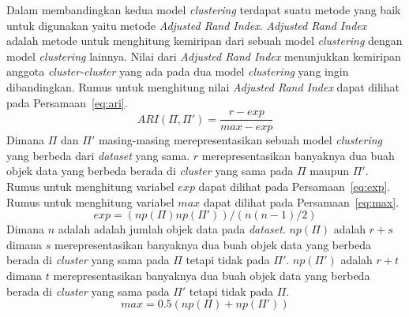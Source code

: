 Dalam membandingkan kedua model \textit{clustering} terdapat suatu metode yang baik untuk digunakan yaitu metode \textit{Adjusted Rand Index}. \textit{Adjusted Rand Index}~\cite{torra:12:privacy} adalah metode untuk menghitung kemiripan dari sebuah model \textit{clustering} dengan model \textit{clustering} lainnya. Nilai dari \textit{Adjusted Rand Index} menunjukkan kemiripan anggota \textit{cluster-cluster} yang ada pada dua model \textit{clustering} yang ingin dibandingkan. Rumus untuk menghitung nilai \textit{Adjusted Rand Index} dapat dilihat pada Persamaan~\ref{eq:ari}.
\begin{equation}\label{eq:ari}
	ARI(\Pi, \Pi')=\frac{r-exp}{max-exp}
\end{equation}
Dimana \(\Pi\) dan \(\Pi'\) masing-masing merepresentasikan sebuah model \textit{clustering} yang berbeda dari \textit{dataset} yang sama. \(r\) merepresentasikan banyaknya dua buah objek data yang berbeda berada di \textit{cluster} yang sama pada \(\Pi\) maupun \(\Pi'\). Rumus untuk menghitung variabel \(exp\) dapat dilihat pada Persamaan~\ref{eq:exp}. Rumus untuk menghitung variabel \(max\) dapat dilihat pada Persamaan~\ref{eq:max}.
\begin{equation}\label{eq:exp}
	exp=(np(\Pi)np(\Pi'))/(n(n-1)/2)
\end{equation}
Dimana \(n\) adalah adalah jumlah objek data pada \textit{dataset}. \(np(\Pi)\) adalah \(r+s\) dimana \(s\) merepresentasikan banyaknya dua buah objek data yang berbeda berada di \textit{cluster} yang sama pada \(\Pi\) tetapi tidak pada \(\Pi'\). \(np(\Pi')\) adalah \(r+t\) dimana \(t\) merepresentasikan banyaknya dua buah objek data yang berbeda berada di \textit{cluster} yang sama pada \(\Pi'\) tetapi tidak pada \(\Pi\).
\begin{equation}\label{eq:max}
	max=0.5(np(\Pi)+np(\Pi'))
\end{equation}

